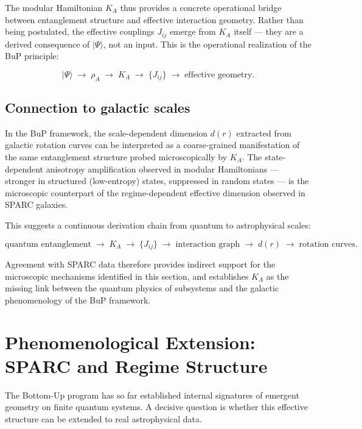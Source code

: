 \documentclass[11pt]{article}
\begin{document}
\medskip
The modular Hamiltonian $K_A$ thus provides a concrete operational
bridge between entanglement structure and effective interaction
geometry. Rather than being postulated, the effective couplings
$J_{ij}$ emerge from $K_A$ itself --- they are a derived consequence
of $|\Psi\rangle$, not an input. This is the operational realization
of the BuP principle:

\[
|\Psi\rangle \;\rightarrow\; \rho_A \;\rightarrow\; K_A
\;\rightarrow\; \{J_{ij}\} \;\rightarrow\; \text{effective geometry.}
\]

\subsection{Connection to galactic scales}

In the BuP framework, the scale-dependent dimension $d(r)$ extracted
from galactic rotation curves can be interpreted as a coarse-grained
manifestation of the same entanglement structure probed
microscopically by $K_A$. The state-dependent anisotropy
amplification observed in modular Hamiltonians --- stronger in
structured (low-entropy) states, suppressed in random states ---
is the microscopic counterpart of the regime-dependent effective
dimension observed in SPARC galaxies.

This suggests a continuous derivation chain from quantum to
astrophysical scales:

\[
\text{quantum entanglement}
\;\rightarrow\; K_A \;\rightarrow\; \{J_{ij}\}
\;\rightarrow\; \text{interaction graph}
\;\rightarrow\; d(r)
\;\rightarrow\; \text{rotation curves.}
\]

Agreement with SPARC data therefore provides indirect support for
the microscopic mechanisms identified in this section, and establishes
$K_A$ as the missing link between the quantum physics of subsystems
and the galactic phenomenology of the BuP framework.


\section{Phenomenological Extension: SPARC and Regime Structure}

The Bottom-Up program has so far established internal signatures of
emergent geometry on finite quantum systems. A decisive question is
whether this effective structure can be extended to real astrophysical
data.
\end{document}
